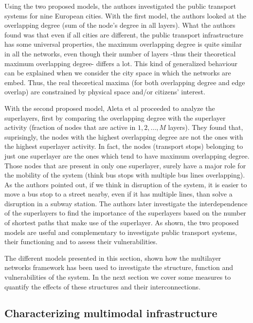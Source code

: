 Using the two proposed models, the authors investigated the public transport systems for nine European cities. With the first model, the authors looked at the overlapping degree (sum of the node's degree in all layers). What the authors found was that even if all cities are different, the public transport infrastructure has some universal properties, the maximum overlapping degree is quite similar in all the networks, even though their number of layers -thus their theoretical maximum overlapping degree- differs a lot. This kind of generalized behaviour can be explained when we consider the city space in which the networks are embed. Thus, the real theoretical maxima (for both overlapping degree and edge overlap) are constrained by physical space and/or citizens' interest.

With the second proposed model, Aleta et al \cite{aleta2017transportation} proceeded to analyze the superlayers, first by comparing the overlapping degree with the superlayer activity (fraction of nodes that are active in $1, 2, \dots, M$ layers). They found that, suprisingly, the nodes with the highest overlapping degree are not the ones with the highest superlayer activity. In fact, the nodes (transport stops) belonging to just one superlayer are the ones which tend to have maximum overlapping degree. Those nodes that are present in only one superlayer, surely have a major role for the mobility of the system (think bus stops with multiple bus lines overlapping). As the authors pointed out, if we think in disruption of the system, it is easier to move a bus stop to a street nearby, even if it has multiple lines, than solve a disruption in a subway station. The authors later investigate the interdependence of the superlayers to find the importance of the superlayers based on the number of shortest paths that make use of the superlayer. As shown, the two proposed models are useful and complementary to investigate public transport systems, their functioning and to assess their vulnerabilities. 

The different models presented in this section, shown how the multilayer networks framework has been used to investigate the structure, function and vulnerabilities of the system. In the next section we cover some measures to quantify the effects of these structures and their interconnections.

\subsection{Characterizing multimodal infrastructure}\label{sec:measuresinfrastructure}

